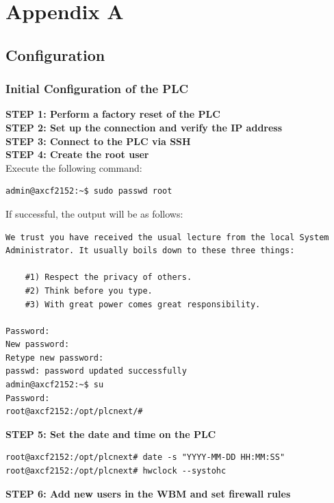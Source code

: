\documentclass[Master,BMR,english]{twbook}
\begin{document}
\chapter{Appendix A}

\section{Configuration}

\subsection{Initial Configuration of the PLC}

\textbf{STEP 1: Perform a factory reset of the PLC}\\

\textbf{STEP 2: Set up the connection and verify the IP address}\\

\textbf{STEP 3: Connect to the PLC via SSH}\\

\textbf{STEP 4: Create the root user}\\

Execute the following command:
\begin{verbatim}
admin@axcf2152:~$ sudo passwd root
\end{verbatim}
If successful, the output will be as follows:
\begin{verbatim}
We trust you have received the usual lecture from the local System
Administrator. It usually boils down to these three things:

    #1) Respect the privacy of others.
    #2) Think before you type.
    #3) With great power comes great responsibility.

Password:
New password:
Retype new password:
passwd: password updated successfully
admin@axcf2152:~$ su
Password:
root@axcf2152:/opt/plcnext/#
\end{verbatim}
\textbf{STEP 5: Set the date and time on the PLC}\\
\begin{verbatim}
root@axcf2152:/opt/plcnext# date -s "YYYY-MM-DD HH:MM:SS"
root@axcf2152:/opt/plcnext# hwclock --systohc
\end{verbatim}
\textbf{STEP 6: Add new users in the WBM and set firewall rules}\\
\end{document}
